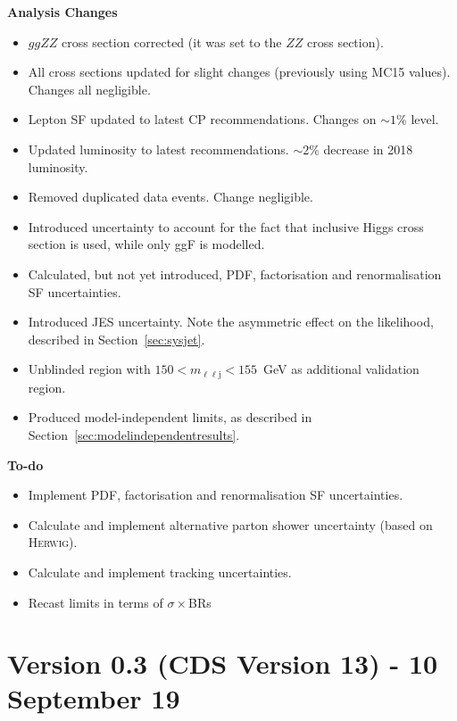 \documentclass[NOTE, atlasdraft=true, texlive=2017, UKenglish]{\ATLASLATEXPATH atlasdoc}
\begin{document}
\textbf{Analysis Changes}
\begin{itemize}
\item $ggZZ$ cross section corrected (it was set to the $ZZ$ cross section).
\item All cross sections updated for slight changes (previously using MC15 values). Changes all negligible.
\item Lepton SF updated to latest CP recommendations. Changes on $\sim 1\%$ level.
\item Updated luminosity to latest recommendations. $\sim 2\%$ decrease in 2018 luminosity.
\item Removed duplicated data events. Change negligible.
\item Introduced uncertainty to account for the fact that inclusive Higgs cross section is used, while only ggF is modelled.
\item Calculated, but not yet introduced, PDF, factorisation and renormalisation SF uncertainties.
\item Introduced JES uncertainty. Note the asymmetric effect on the likelihood, described in Section~\ref{sec:sysjet}.
\item Unblinded region with $150<m_{\ell\ell\text{j}}<155$~GeV as additional validation region.
\item Produced model-independent limits, as described in Section~\ref{sec:modelindependentresults}.
\end{itemize}

\textbf{To-do}%
\begin{itemize}
\item Implement PDF, factorisation and renormalisation SF uncertainties.
\item Calculate and implement alternative parton shower uncertainty (based on \textsc{Herwig}).
\item Calculate and implement tracking uncertainties.
\item Recast limits in terms of $\sigma\times$BRs
\end{itemize}


\section*{Version 0.3 (CDS Version 13) - 10 September 19}
\end{document}
